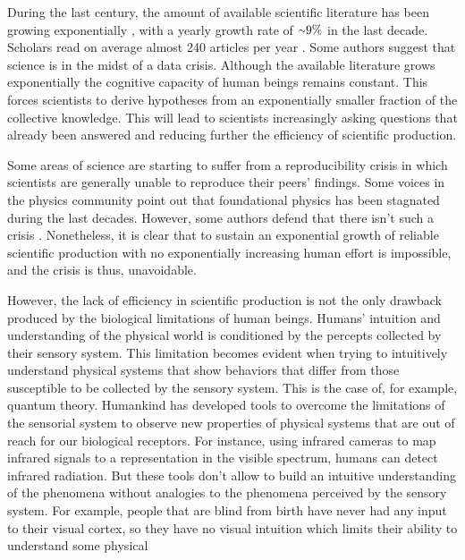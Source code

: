 \documentclass[11pt,a4paper,twoside]{report}
\newcommand{\+}{\textnormal{+} }
\theoremstyle{definition}
\numberwithin{equation}{chapter}
\begin{document}
During the last century, the amount of available scientific literature has been
growing exponentially \cite{sinatra2015century,BornmannRudiger}, with a yearly
growth rate of $ {\raise.17ex\hbox{$\scriptstyle\mathtt{\sim}$}} 9\%$ in the
last decade. Scholars read on average almost 240 articles per year
\cite{publications7010018}. Some authors \cite{Alkhateeb} suggest that science
is in the midst of a data crisis. Although the available literature grows
exponentially the cognitive capacity of human beings remains constant. This
forces scientists to derive hypotheses from an exponentially smaller fraction of
the collective knowledge. This will lead to scientists increasingly asking
questions that already been answered and reducing further the efficiency of
scientific production. 

Some areas of science are starting to suffer from a reproducibility crisis
\cite{Saltelli, begley2012raise} in which scientists are generally unable to
reproduce their peers' findings. Some voices in the physics community
\cite{Sabine} point out that foundational physics has been stagnated during the
last decades. However, some authors defend that there isn't such a crisis
\cite{Fanelli2628}. Nonetheless, it is clear that to sustain an exponential
growth of reliable scientific production with no exponentially increasing human
effort is impossible, and the crisis is thus, unavoidable.
 \par
However, the lack of efficiency in scientific production is not the only
drawback produced by the biological limitations of human beings. Humans'
intuition and understanding of the physical world is conditioned by the percepts
collected by their sensory system. This limitation becomes evident when trying
to intuitively understand physical systems that show behaviors that differ from
those susceptible to be collected by the sensory system. This is the case of,
for example, quantum theory. Humankind has developed tools to overcome the
limitations of the sensorial system to observe new properties of physical
systems that are out of reach for our biological receptors. For instance, using
infrared cameras to map infrared signals to a representation in the visible
spectrum, humans can detect infrared radiation. But these tools don't allow to
build an intuitive understanding of the phenomena without analogies to the
phenomena perceived by the sensory system. For example, people that are blind
from birth have never had any input to their visual cortex, so they have no
visual intuition which limits their ability to understand some physical
\end{document}
